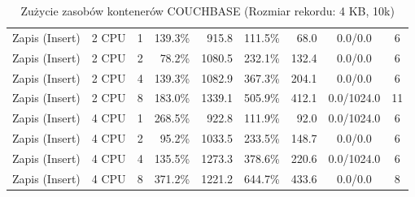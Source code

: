 \begin{table}[ht]
{\begin{tabular}{llcrrrrcc}
Zapis (Insert) & 2 CPU & 1 & 139.3\% & 915.8 & 111.5\% & 68.0 & 0.0/0.0 & 6 \\
Zapis (Insert) & 2 CPU & 2 & 78.2\% & 1080.5 & 232.1\% & 132.4 & 0.0/0.0 & 6 \\
Zapis (Insert) & 2 CPU & 4 & 139.3\% & 1082.9 & 367.3\% & 204.1 & 0.0/0.0 & 6 \\
Zapis (Insert) & 2 CPU & 8 & 183.0\% & 1339.1 & 505.9\% & 412.1 & 0.0/1024.0 & 11 \\
Zapis (Insert) & 4 CPU & 1 & 268.5\% & 922.8 & 111.9\% & 92.0 & 0.0/1024.0 & 6 \\
Zapis (Insert) & 4 CPU & 2 & 95.2\% & 1033.5 & 233.5\% & 148.7 & 0.0/0.0 & 6 \\
Zapis (Insert) & 4 CPU & 4 & 135.5\% & 1273.3 & 378.6\% & 220.6 & 0.0/1024.0 & 6 \\
Zapis (Insert) & 4 CPU & 8 & 371.2\% & 1221.2 & 644.7\% & 433.6 & 0.0/0.0 & 8 \\
\bottomrule
\end{tabular}%
}
\caption{Zużycie zasobów kontenerów COUCHBASE (Rozmiar rekordu: 4 KB, 10k)}
\label{tab:resources_couchbase_medium_10000}
\end{table}
